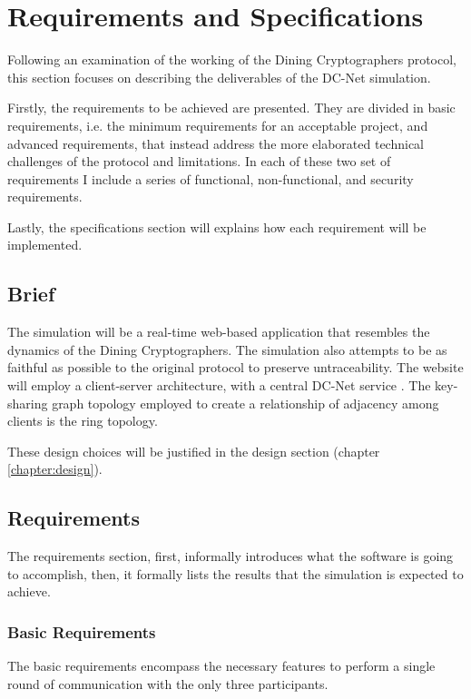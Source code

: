 \chapter{Requirements and Specifications} \label{chapter:requirements}

Following an examination of the working of the Dining Cryptographers protocol, this section focuses on describing the deliverables of the DC-Net simulation. 

Firstly, the requirements to be achieved are presented. They are divided in basic requirements, i.e. the minimum requirements for an acceptable project, and advanced requirements, that instead address the more elaborated technical challenges of the protocol and limitations. In each of these two set of requirements I include a series of functional, non-functional, and security requirements. 

Lastly, the specifications section will explains how each requirement will be implemented.

\section{Brief}
The simulation will be a real-time web-based application that resembles the dynamics of the Dining Cryptographers. The simulation also attempts to be as faithful as possible to the original protocol to preserve untraceability. The website will employ a client-server architecture, with a central DC-Net service . The key-sharing graph topology employed to create a relationship of adjacency among clients is the ring topology.

These design choices will be justified in the design section (chapter \ref{chapter:design}).

\section{Requirements} \label{sec:requirements}
The requirements section, first, informally introduces what the software is going to accomplish, then, it formally lists the results that the simulation is expected to achieve.

\subsection{Basic Requirements}
The basic requirements encompass the necessary features to perform a single round of communication with the only three participants.

